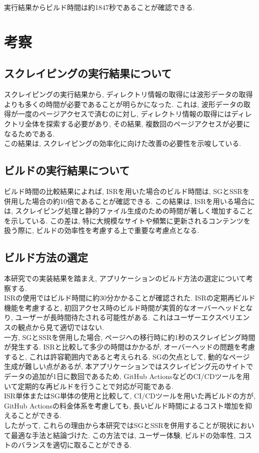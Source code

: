 実行結果からビルド時間は約1847秒であることが確認できる.

\section{考察}
\subsection{スクレイピングの実行結果について}
スクレイピングの実行結果から, ディレクトリ情報の取得には波形データの取得よりも多くの時間が必要であることが明らかになった. 
これは, 波形データの取得が一度のページアクセスで済むのに対し, ディレクトリ情報の取得にはディレクトリ全体を探索する必要があり, その結果, 複数回のページアクセスが必要になるためである. \\
この結果は, スクレイピングの効率化に向けた改善の必要性を示唆している. 

\subsection{ビルドの実行結果について}
ビルド時間の比較結果によれば, ISRを用いた場合のビルド時間は, SGとSSRを併用した場合の約10倍であることが確認できる. 
この結果は, ISRを用いる場合には, スクレイピング処理と静的ファイル生成のための時間が著しく増加することを示している. 
この差は, 特に大規模なサイトや頻繁に更新されるコンテンツを扱う際に, ビルドの効率性を考慮する上で重要な考慮点となる. 

\subsection{ビルド方法の選定}
本研究での実装結果を踏まえ, アプリケーションのビルド方法の選定について考察する. \\
ISRの使用ではビルド時間に約30分かかることが確認された. 
ISRの定期再ビルド機能を考慮すると, 初回アクセス時のビルド時間が実質的なオーバーヘッドとなり, ユーザーが長時間待たされる可能性がある. 
これはユーザーエクスペリエンスの観点から見て適切ではない. \\
一方, SGとSSRを併用した場合, ページへの移行時に約1秒のスクレイピング時間が発生する. 
ISRと比較して多少の時間はかかるが, オーバーヘッドの問題を考慮すると, これは許容範囲内であると考えられる. 
SGの欠点として, 動的なページ生成が難しい点があるが, 本アプリケーションではスクレイピング元のサイトでデータの追加が1日に数回であるため, GitHub ActionsなどのCI/CDツールを用いて定期的な再ビルドを行うことで対応が可能である. \\
ISR単体またはSG単体の使用と比較して, CI/CDツールを用いた再ビルドの方が, GitHub Actionsの料金体系を考慮しても, 長いビルド時間によるコスト増加を抑えることができる. \\
したがって, これらの理由から本研究ではSGとSSRを併用することが現状において最適な手法と結論づけた. 
この方法では, ユーザー体験, ビルドの効率性, コストのバランスを適切に取ることができる. 


